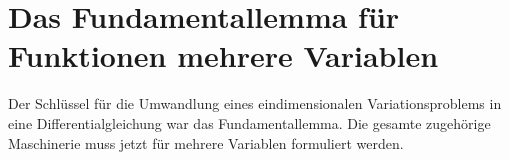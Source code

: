 %
%
%
\section{Das Fundamentallemma für Funktionen mehrere Variablen
\label{buch:felder:section:fundamentallemma}}
Der Schlüssel für die Umwandlung eines eindimensionalen Variationsproblems
in eine Differentialgleichung war das Fundamentallemma.
Die gesamte zugehörige Maschinerie muss jetzt für mehrere Variablen
formuliert werden.






